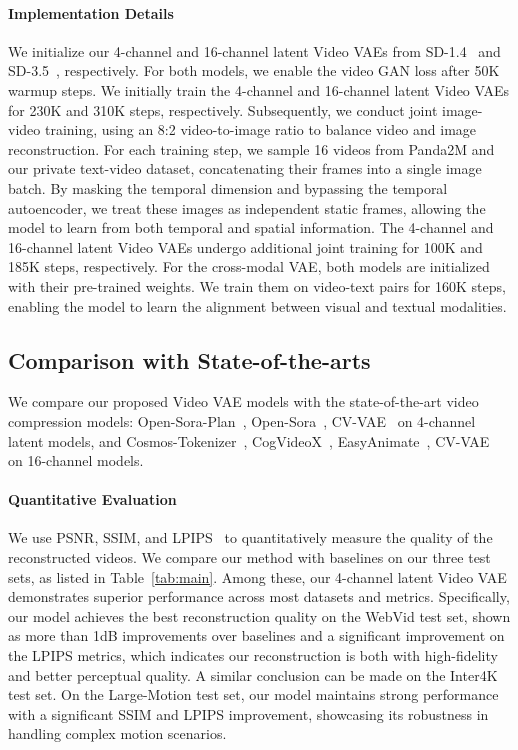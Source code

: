 \paragraph{Implementation Details}
We initialize our 4-channel and 16-channel latent Video VAEs from SD-1.4~\cite{rombach2022high} and SD-3.5~\cite{sd35}, respectively. For both models, we enable the video GAN loss after 50K warmup steps.
We initially train the 4-channel and 16-channel latent Video VAEs for 230K and 310K steps, respectively. Subsequently, we conduct joint image-video training, using an 8:2 video-to-image ratio to balance video and image reconstruction. For each training step, we sample 16 videos from Panda2M and our private text-video dataset, concatenating their frames into a single image batch. By masking the temporal dimension and bypassing the temporal autoencoder, we treat these images as independent static frames, allowing the model to learn from both temporal and spatial information.
The 4-channel and 16-channel latent Video VAEs undergo additional joint training for 100K and 185K steps, respectively.
For the cross-modal VAE, both models are initialized with their pre-trained weights. We train them on video-text pairs for 160K steps, enabling the model to learn the alignment between visual and textual modalities.




\subsection{Comparison with State-of-the-arts}

We compare our proposed Video VAE models with the state-of-the-art video compression models: Open-Sora-Plan~\cite{pku_yuan_lab_and_tuzhan_ai_etc_2024_10948109}, Open-Sora~\cite{opensora}, CV-VAE~\cite{zhao2024cv} on 4-channel latent models, and Cosmos-Tokenizer~\cite{cosmos_token}, CogVideoX~\cite{yang2024cogvideox}, EasyAnimate~\cite{xu2024easyanimatehighperformancelongvideo}, CV-VAE~\cite{zhao2024cv} on 16-channel models. 

\paragraph{Quantitative Evaluation}
We use PSNR, SSIM, and LPIPS~\cite{lpips} to quantitatively measure the quality of the reconstructed videos. We compare our method with baselines on our three test sets, as listed in Table~\ref{tab:main}. 
Among these, our 4-channel latent Video VAE demonstrates superior performance across most datasets and metrics. 
Specifically, our model achieves the best reconstruction quality on the WebVid test set, shown as more than 1dB improvements over baselines and a significant improvement on the LPIPS metrics, which indicates our reconstruction is both with high-fidelity and better perceptual quality. A similar conclusion can be made on the Inter4K test set. On the Large-Motion test set, our model maintains strong performance with a significant SSIM and LPIPS improvement, showcasing its robustness in handling complex motion scenarios.


